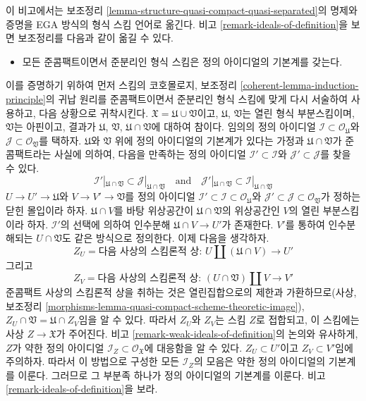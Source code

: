\begin{remark}
\label{remark-structure-quasi-compact-quasi-separated}
이 비고에서는 보조정리
\ref{lemma-structure-quasi-compact-quasi-separated}의 명제와 증명을
EGA 방식의 형식 스킴 언어로 옮긴다.
비고 \ref{remark-ideals-of-definition}을 보면 보조정리를 다음과 같이
옮길 수 있다.
\begin{itemize}
\item[(*)] 모든 준콤팩트이면서 준분리인 형식 스킴은 정의
아이디얼의 기본계를 갖는다.
\end{itemize}
이를 증명하기 위하여 먼저 스킴의 코호몰로지, 보조정리
\ref{coherent-lemma-induction-principle}의 귀납 원리를
준콤팩트이면서 준분리인 형식 스킴에 맞게 다시 서술하여 사용하고,
다음 상황으로 귀착시킨다.
$\mathfrak X = \mathfrak U \cup \mathfrak V$이고,
$\mathfrak U$, $\mathfrak V$는 열린 형식 부분스킴이며,
$\mathfrak V$는 아핀이고, 결과가 $\mathfrak U$,
$\mathfrak V$, $\mathfrak U \cap \mathfrak V$에 대하여 참이다.
임의의 정의 아이디얼
$\mathcal{I} \subset \mathcal{O}_\mathfrak U$와
$\mathcal{J} \subset \mathcal{O}_\mathfrak V$를 택하자.
$\mathfrak U$와 $\mathfrak V$ 위에 정의 아이디얼의 기본계가 있다는
가정과 $\mathfrak U \cap \mathfrak V$가 준콤팩트라는 사실에 의하여,
다음을 만족하는 정의 아이디얼
$\mathcal{I}' \subset \mathcal{I}$와
$\mathcal{J}' \subset \mathcal{J}$를 찾을 수 있다.
$$
\mathcal{I}'|_{\mathfrak U \cap \mathfrak V} \subset
\mathcal{J}|_{\mathfrak U \cap \mathfrak V}
\quad\text{and}\quad
\mathcal{J}'|_{\mathfrak U \cap \mathfrak V} \subset
\mathcal{I}|_{\mathfrak U \cap \mathfrak V}
$$
$U \to U' \to \mathfrak U$와 $V \to V' \to \mathfrak V$를
정의 아이디얼
$\mathcal{I}' \subset \mathcal{I} \subset \mathcal{O}_\mathfrak U$와
$\mathcal{J}' \subset \mathcal{J} \subset \mathcal{O}_\mathfrak V$가
정하는 닫힌 몰입이라 하자. $\mathfrak U \cap V$를 바탕 위상공간이
$\mathfrak U \cap \mathfrak V$의 위상공간인 $V$의 열린 부분스킴이라
하자. $\mathcal{I}'$의 선택에 의하여 인수분해
$\mathfrak U \cap V \to U'$가 존재한다.
$V'$를 통하여 인수분해되는 $U \cap \mathfrak V$도 같은 방식으로
정의한다. 이제 다음을 생각하자.
$$
Z_U = \text{다음 사상의 스킴론적 상: }
U \amalg (\mathfrak U \cap V) \longrightarrow U'
$$
그리고
$$
Z_V = \text{다음 사상의 스킴론적 상: }
(U \cap \mathfrak V) \amalg V \longrightarrow V'
$$
준콤팩트 사상의 스킴론적 상을 취하는 것은 열린집합으로의 제한과
가환하므로(사상, 보조정리
\ref{morphisms-lemma-quasi-compact-scheme-theoretic-image}),
$Z_U \cap \mathfrak V = \mathfrak U \cap Z_V$임을 알 수 있다.
따라서 $Z_U$와 $Z_V$는 스킴 $Z$로 접합되고, 이 스킴에는 사상
$Z \to \mathfrak X$가 주어진다. 비고
\ref{remark-weak-ideals-of-definition}의 논의와 유사하게,
$Z$가 약한 정의 아이디얼
$\mathcal{I}_Z \subset \mathcal{O}_\mathfrak X$에 대응함을 알 수 있다.
$Z_U \subset U'$이고 $Z_V \subset V'$임에 주의하자.
따라서 이 방법으로 구성한 모든 $\mathcal{I}_Z$의 모음은 약한 정의
아이디얼의 기본계를 이룬다. 그러므로 그 부분족 하나가 정의
아이디얼의 기본계를 이룬다. 비고
\ref{remark-ideals-of-definition}을 보라.
\end{remark}

